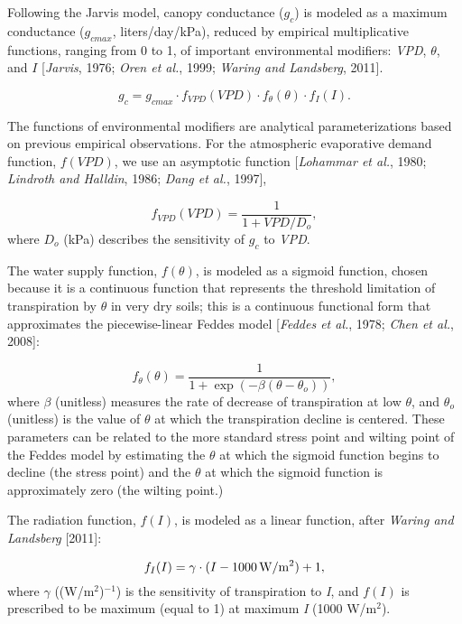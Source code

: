 Following the Jarvis model, canopy conductance ($g_c$) is modeled as a maximum conductance ($g_{cmax}$, liters/day/kPa), reduced by empirical multiplicative functions, ranging from 0 to 1, of important environmental modifiers: \textit{VPD}, $\theta$, and $I$ [\textit{Jarvis}, 1976; \textit{Oren et al.}, 1999; \textit{Waring and Landsberg}, 2011].

\begin{equation}  %
g_c = g_{cmax} \cdot f_{VPD}(VPD) \cdot f_{\theta}(\theta) \cdot f_I(I).
\end{equation}

The functions of environmental modifiers are analytical parameterizations based on previous empirical observations.  For the atmospheric evaporative demand function, $f(VPD)$, we use an asymptotic function [\textit{Lohammar et al.}, 1980; \textit{Lindroth and Halldin}, 1986; \textit{Dang et al.}, 1997],

\begin{equation}  %
f_{VPD}(VPD) = \frac{1}{1+VPD/D_o},
\end{equation}
where $D_o$ (kPa) describes the sensitivity of $g_c$ to \textit{VPD}.

The water supply function, $f(\theta)$, is modeled as a sigmoid function, chosen because it is a continuous function that represents the threshold limitation of transpiration by $\theta$ in very dry soils; this is a continuous functional form that approximates the piecewise-linear Feddes model [\textit{Feddes et al.}, 1978; \textit{Chen et al.}, 2008]:

\begin{equation}  %
f_{\theta}(\theta) = \frac{1}{1+\exp(-\beta(\theta-\theta_o))},
\end{equation}
where $\beta$ (unitless) measures the rate of decrease of transpiration at low $\theta$, and $\theta_o$ (unitless) is the value of $\theta$ at which the transpiration decline is centered.  These parameters can be related to the more standard stress point and wilting point of the Feddes model by estimating the $\theta$ at which the sigmoid function begins to decline (the stress point) and the $\theta$ at which the sigmoid function is approximately zero (the wilting point.)

The radiation function, $f(I)$, is modeled as a linear function, after \textit{Waring and Landsberg} [2011]:

\begin{equation}  %
f_I(I) = \gamma \cdot (I-1000 \, {\rm W/m^2})+1,
\end{equation}
where $\gamma$ ((W/m$^2$)$^{-1}$) is the sensitivity of transpiration to \textit{I}, and $f(I)$ is prescribed to be maximum (equal to 1) at maximum \textit{I} (1000 W/m$^2$).

